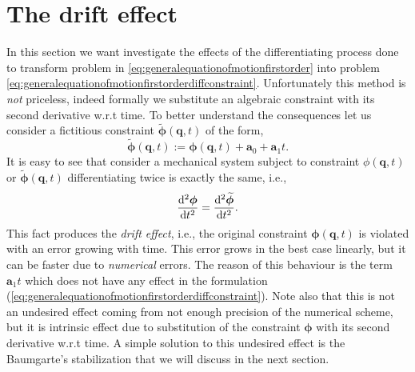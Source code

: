 %
%
	
\section{The drift effect}

In this section we want investigate the effects of the 
differentiating process done to transform problem in 
\cref{eq:generalequationofmotionfirstorder} into problem 
\cref{eq:generalequationofmotionfirstorderdiffconstraint}. 
Unfortunately this method is \emph{not} priceless, 
indeed formally we substitute an algebraic constraint with 
its second derivative w.r.t time. To better understand the 
consequences let us consider a fictitious constraint 
$\widetilde{\bm{\phi}}(\bm{q},t)$ of the form,
\begin{equation}
	\widetilde{\bm{\phi}}(\bm{q},t) := \bm{\phi}(\bm{q},t)+\bm{a}_0 + \bm{a}_{1}t.
\end{equation}
It is easy to see that consider a mechanical system subject to
constraint $\phi(\bm{q},t)$ or $\widetilde{\bm{\phi}}(\bm{q},t)$
differentiating twice is exactly the same, i.e.,
\begin{equation}
	\frac{\mathop{}\!\mathrm{d}^2\bm{\phi}}{\mathop{}\!\mathrm{d} t^2} = \frac{\mathop{}\!\mathrm{d}^2\widetilde{\bm{\phi}}}{\mathop{}\!\mathrm{d} t^2}.
\end{equation}
This fact produces the \emph{drift effect}, i.e., the original
constraint $\bm{\phi}(\bm{q},t)$ is violated with an error growing
with time. This error grows in the best case linearly, but it can be
faster due to \emph{numerical} errors.
The reason of this behaviour is the term $\bm{a}_{1}t$ which does
not have any effect in the formulation
(\ref{eq:generalequationofmotionfirstorderdiffconstraint}).
Note also that this is not an undesired effect coming from not
enough precision of the numerical scheme, but it is intrinsic
effect due to substitution of the constraint $\bm{\phi}$ with
its second derivative w.r.t time. A simple solution to this
undesired effect is the Baumgarte's stabilization that we
will discuss in the next section.
